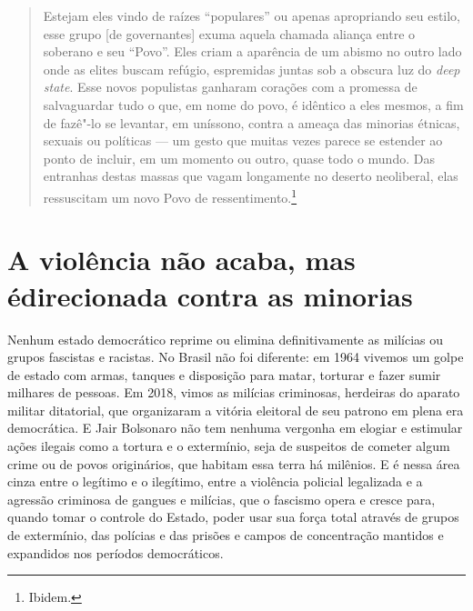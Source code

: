 \begin{quote}
Estejam eles vindo de raízes ``populares'' ou apenas apropriando seu estilo, esse grupo [de governantes] exuma aquela chamada aliança entre o soberano e seu ``Povo''. Eles criam a aparência de um abismo no outro lado onde as elites buscam refúgio, espremidas juntas sob a obscura luz do \emph{deep state}. Esse novos populistas ganharam corações com a promessa de salvaguardar tudo o que, em nome do povo, é idêntico a eles mesmos, a fim de fazê"-lo se levantar, em uníssono, contra a ameaça das minorias étnicas, sexuais ou políticas --- um gesto que muitas vezes parece se estender ao ponto de incluir, em um momento ou outro, quase todo o mundo. Das entranhas destas massas que vagam longamente no deserto neoliberal, elas ressuscitam um novo Povo de ressentimento.\footnote{Ibidem.}
\end{quote}

\section{A violência não acaba, mas é\break direcionada contra as minorias}

Nenhum estado democrático reprime ou elimina definitivamente as milícias ou grupos fascistas e racistas. No Brasil não foi diferente: em 1964 vivemos um golpe de estado com armas, tanques e disposição para matar, torturar e fazer sumir milhares de pessoas. Em 2018, vimos as milícias criminosas, herdeiras do aparato militar ditatorial, que organizaram a vitória eleitoral de seu patrono em plena era democrática. E Jair Bolsonaro não tem nenhuma vergonha em elogiar e estimular ações ilegais como a tortura e o extermínio, seja de suspeitos de cometer algum crime ou de povos originários, que habitam essa terra há milênios. E é nessa área cinza entre o legítimo e o ilegítimo, entre a violência policial legalizada e a agressão criminosa de gangues e milícias, que o fascismo opera e cresce para, quando tomar o controle do Estado, poder usar sua força total através de grupos de extermínio, das polícias e das prisões e campos de concentração mantidos e expandidos nos períodos democráticos.

